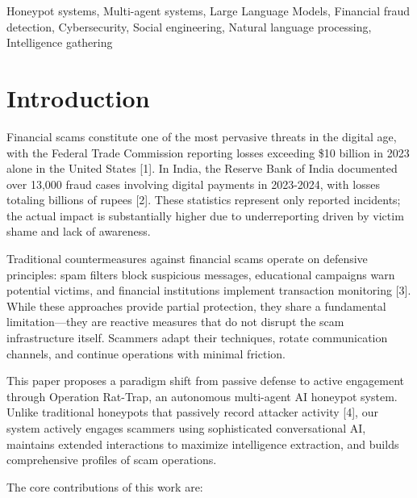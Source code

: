 \documentclass[conference]{IEEEtran}
\begin{document}
\begin{IEEEkeywords}
Honeypot systems, Multi-agent systems, Large Language Models, Financial fraud detection, Cybersecurity, Social engineering, Natural language processing, Intelligence gathering
\end{IEEEkeywords}

\section{Introduction}

Financial scams constitute one of the most pervasive threats in the digital age, with the Federal Trade Commission reporting losses exceeding \$10 billion in 2023 alone in the United States [1]. In India, the Reserve Bank of India documented over 13,000 fraud cases involving digital payments in 2023-2024, with losses totaling billions of rupees [2]. These statistics represent only reported incidents; the actual impact is substantially higher due to underreporting driven by victim shame and lack of awareness.

Traditional countermeasures against financial scams operate on defensive principles: spam filters block suspicious messages, educational campaigns warn potential victims, and financial institutions implement transaction monitoring [3]. While these approaches provide partial protection, they share a fundamental limitation---they are reactive measures that do not disrupt the scam infrastructure itself. Scammers adapt their techniques, rotate communication channels, and continue operations with minimal friction.

This paper proposes a paradigm shift from passive defense to active engagement through Operation Rat-Trap, an autonomous multi-agent AI honeypot system. Unlike traditional honeypots that passively record attacker activity [4], our system actively engages scammers using sophisticated conversational AI, maintains extended interactions to maximize intelligence extraction, and builds comprehensive profiles of scam operations.

The core contributions of this work are:
\end{document}
